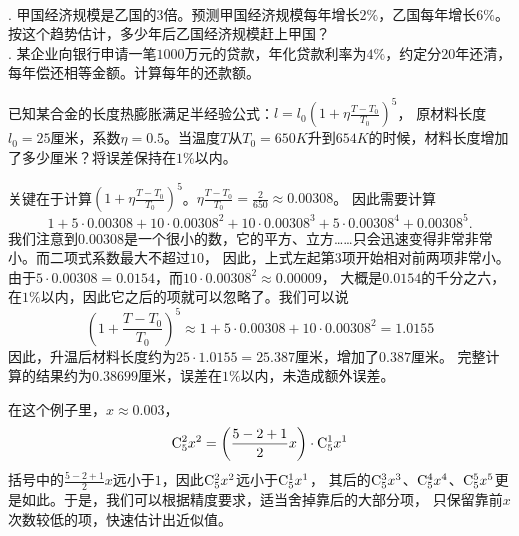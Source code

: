 \documentclass[12pt,UTF8]{ctexbook}
\begin{document}
\begin{xt}
    \mbox{} \\
    . 甲国经济规模是乙国的3倍。预测甲国经济规模每年增长$2\%$，乙国每年增长$6\%$。按这个趋势估计，多少年后乙国经济规模赶上甲国？\\
    . 某企业向银行申请一笔$1000$万元的贷款，年化贷款利率为$4\%$，约定分$20$年还清，每年偿还相等金额。计算每年的还款额。
\end{xt}

\begin{et}
    已知某合金的长度热膨胀满足半经验公式：$l = l_0(1+\eta\frac{T-T_0}{T_0})^5$，
    原材料长度$l_0=25$厘米，系数$\eta=0.5$。当温度$T$从$T_0=650K$升到$654K$的时候，材料长度增加了多少厘米？将误差保持在$1\%$以内。
\end{et}
\begin{so}
    关键在于计算$(1+\eta\frac{T-T_0}{T_0})^5$。$\eta\frac{T-T_0}{T_0} = \frac{2}{650} \approx 0.00308$。
    因此需要计算
    $$ 1 + 5\cdot 0.00308 + 10\cdot 0.00308^2 + 10 \cdot 0.00308^3 + 5 \cdot 0.00308^4 + 0.00308^5. $$
    我们注意到$0.00308$是一个很小的数，它的平方、立方……只会迅速变得非常非常小。而二项式系数最大不超过$10$，
    因此，上式左起第$3$项开始相对前两项非常小。\\
    由于$5 \cdot 0.00308 = 0.0154$，而$10\cdot 0.00308^2 \approx 0.00009$，
    大概是$0.0154$的千分之六，在$1\%$以内，因此它之后的项就可以忽略了。我们可以说
    $$ \left(1+\frac{T-T_0}{T_0}\right)^5 \approx 1 + 5\cdot 0.00308 + 10\cdot 0.00308^2 = 1.0155 $$
    因此，升温后材料长度约为$25\cdot 1.0155 = 25.387$厘米，增加了$0.387$厘米。
    完整计算的结果约为$0.38699$厘米，误差在$1\%$以内，未造成额外误差。   
\end{so}

在这个例子里，$x\approx 0.003$，
$$\mathrm{C}_{5}^{2}x^2 = \left(\frac{5-2+1}{2}x\right)\cdot \mathrm{C}_{5}^{1}x^1$$
括号中的$\frac{5-2+1}{2}x$远小于$1$，因此$\mathrm{C}_{5}^{2}x^2$远小于$\mathrm{C}_{5}^{1}x^1$，
其后的$\mathrm{C}_{5}^{3}x^3$、$\mathrm{C}_{5}^{4}x^4$、$\mathrm{C}_{5}^{5}x^5$更是如此。于是，我们可以根据精度要求，适当舍掉靠后的大部分项，
只保留靠前$x$次数较低的项，快速估计出近似值。
\end{document}
